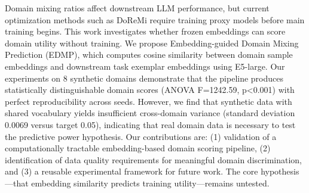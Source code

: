 
Domain mixing ratios affect downstream LLM performance, but current optimization methods such as DoReMi require training proxy models before main training begins. This work investigates whether frozen embeddings can score domain utility without training. We propose Embedding-guided Domain Mixing Prediction (EDMP), which computes cosine similarity between domain sample embeddings and downstream task exemplar embeddings using E5-large. Our experiments on 8 synthetic domains demonstrate that the pipeline produces statistically distinguishable domain scores (ANOVA F=1242.59, p<0.001) with perfect reproducibility across seeds. However, we find that synthetic data with shared vocabulary yields insufficient cross-domain variance (standard deviation 0.0069 versus target 0.05), indicating that real domain data is necessary to test the predictive power hypothesis. Our contributions are: (1) validation of a computationally tractable embedding-based domain scoring pipeline, (2) identification of data quality requirements for meaningful domain discrimination, and (3) a reusable experimental framework for future work. The core hypothesis---that embedding similarity predicts training utility---remains untested.

